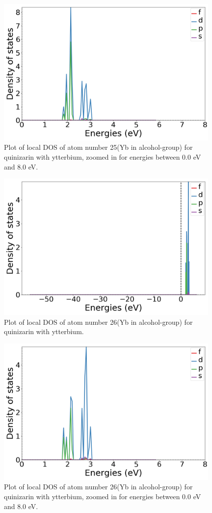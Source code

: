 \documentclass{article}
\begin{document}
  \begin{figure}[H]
      \centering
      \includegraphics[width = 11cm]{../fig/Yb_k4_LDOS25_2.png}
      \caption{Plot of local DOS of atom number 25(Yb in alcohol-group) for quinizarin with ytterbium, zoomed in for energies between 0.0 eV and 8.0 eV. }
      \label{fig:Yb_k4_LDOS25_2.png}
  \end{figure}

  \begin{figure}[H]
      \centering
      \includegraphics[width = 11cm]{../fig/Yb_k4_LDOS26_1.png}
      \caption{Plot of local DOS of atom number 26(Yb in alcohol-group) for quinizarin with ytterbium. }
      \label{fig:Yb_k4_LDOS26_1.png}
  \end{figure}

  \begin{figure}[H]
      \centering
      \includegraphics[width = 11cm]{../fig/Yb_k4_LDOS26_2.png}
      \caption{Plot of local DOS of atom number 26(Yb in alcohol-group) for quinizarin with ytterbium, zoomed in for energies between 0.0 eV and 8.0 eV. }
      \label{fig:Yb_k4_LDOS26_2.png}
  \end{figure}
\end{document}
